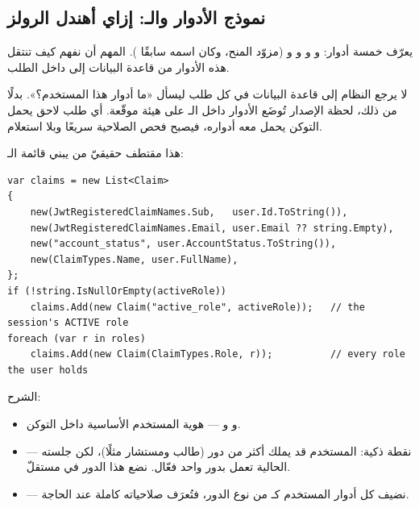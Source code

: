 \subsection{نموذج الأدوار والـ: إزاي أهندل الرولز}

 يعرّف خمسة أدوار:  و
و و و (مزوّد المنح،
وكان اسمه سابقًا ). المهم أن نفهم كيف تنتقل هذه الأدوار من قاعدة
البيانات إلى داخل الطلب.

\begin{keyp}
لا يرجع النظام إلى قاعدة البيانات في كل طلب ليسأل «ما أدوار هذا المستخدم؟». بدلًا
من ذلك، لحظة الإصدار تُوضَع الأدوار داخل الـ على هيئة  موقّعة.
أي طلب لاحق يحمل التوكن يحمل معه أدواره، فيصبح فحص الصلاحية سريعًا وبلا استعلام.
\end{keyp}

هذا مقتطف حقيقيّ من  يبني قائمة الـ:

\begin{english}
\begin{lstlisting}[language={[Sharp]C}]
var claims = new List<Claim>
{
    new(JwtRegisteredClaimNames.Sub,   user.Id.ToString()),
    new(JwtRegisteredClaimNames.Email, user.Email ?? string.Empty),
    new("account_status", user.AccountStatus.ToString()),
    new(ClaimTypes.Name, user.FullName),
};
if (!string.IsNullOrEmpty(activeRole))
    claims.Add(new Claim("active_role", activeRole));   // the session's ACTIVE role
foreach (var r in roles)
    claims.Add(new Claim(ClaimTypes.Role, r));          // every role the user holds
\end{lstlisting}
\end{english}

الشرح:
\begin{itemize}
\item {} و و — هوية المستخدم الأساسية داخل التوكن.
\item {} — نقطة ذكية: المستخدم قد يملك أكثر من دور (طالب ومستشار
  مثلًا)، لكن جلسته الحالية تعمل بدور واحد فعّال. نضع هذا الدور في 
  مستقلّ.
\item {} — نضيف كل أدوار المستخدم كـ
  من نوع الدور، فتُعرَف صلاحياته كاملة عند الحاجة.
\end{itemize}


